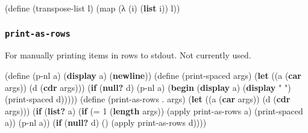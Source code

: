 \documentclass[
]{article}
\newenvironment{Shaded}{}{}
\newcommand{\DecValTok}[1]{\textcolor[rgb]{0.25,0.63,0.44}{#1}}
\newcommand{\ExtensionTok}[1]{#1}
\newcommand{\FunctionTok}[1]{\textcolor[rgb]{0.02,0.16,0.49}{#1}}
\newcommand{\KeywordTok}[1]{\textcolor[rgb]{0.00,0.44,0.13}{\textbf{#1}}}
\newcommand{\NormalTok}[1]{#1}
\newcommand{\OperatorTok}[1]{\textcolor[rgb]{0.40,0.40,0.40}{#1}}
\newcommand{\StringTok}[1]{\textcolor[rgb]{0.25,0.44,0.63}{#1}}
\begin{document}
\hypertarget{transpose-list}{%
\label{transpose-list}}%
\begin{Shaded}
\begin{Highlighting}[]
\NormalTok{(}\ExtensionTok{define}\FunctionTok{ }\NormalTok{(transpose{-}list l)}
\NormalTok{  (map (λ (i) (}\KeywordTok{list}\NormalTok{ i)) l))}
\end{Highlighting}
\end{Shaded}

\hypertarget{print-as-rows}{%
\subsubsection{\texorpdfstring{\texttt{print-as-rows}}{print-as-rows}}\label{print-as-rows}}

For manually printing items in rows to stdout. Not currently used.

\hypertarget{print-as-rows}{%
\label{print-as-rows}}%
\begin{Shaded}
\begin{Highlighting}[]
\NormalTok{(}\ExtensionTok{define}\FunctionTok{ }\NormalTok{(p{-}nl a)}
\NormalTok{  (}\KeywordTok{display}\NormalTok{ a)}
\NormalTok{  (}\KeywordTok{newline}\NormalTok{))}
\NormalTok{(}\ExtensionTok{define}\FunctionTok{ }\NormalTok{(print{-}spaced args)}
\NormalTok{  (}\KeywordTok{let}\NormalTok{ ((a (}\KeywordTok{car}\NormalTok{ args))}
\NormalTok{        (d (}\KeywordTok{cdr}\NormalTok{ args)))}
\NormalTok{    (}\KeywordTok{if}\NormalTok{ (}\KeywordTok{null?}\NormalTok{ d)}
\NormalTok{        (p{-}nl a)}
\NormalTok{        (}\KeywordTok{begin}\NormalTok{ (}\KeywordTok{display}\NormalTok{ a)}
\NormalTok{               (}\KeywordTok{display} \StringTok{" "}\NormalTok{)}
\NormalTok{               (print{-}spaced d)))))}
\NormalTok{(}\ExtensionTok{define}\FunctionTok{ }\NormalTok{(print{-}as{-}rows }\OperatorTok{.}\NormalTok{ args)}
\NormalTok{  (}\KeywordTok{let}\NormalTok{ ((a (}\KeywordTok{car}\NormalTok{ args))}
\NormalTok{        (d (}\KeywordTok{cdr}\NormalTok{ args)))}
\NormalTok{    (}\KeywordTok{if}\NormalTok{ (}\KeywordTok{list?}\NormalTok{ a)}
\NormalTok{        (}\KeywordTok{if}\NormalTok{ (}\OperatorTok{=} \DecValTok{1}\NormalTok{ (}\KeywordTok{length}\NormalTok{ args))}
\NormalTok{            (apply print{-}as{-}rows a)}
\NormalTok{            (print{-}spaced a))}
\NormalTok{        (p{-}nl a))}
\NormalTok{    (}\KeywordTok{if}\NormalTok{ (}\KeywordTok{null?}\NormalTok{ d)}
\NormalTok{        \textquotesingle{}()}
\NormalTok{        (apply print{-}as{-}rows d))))}
\end{Highlighting}
\end{Shaded}
\end{document}
